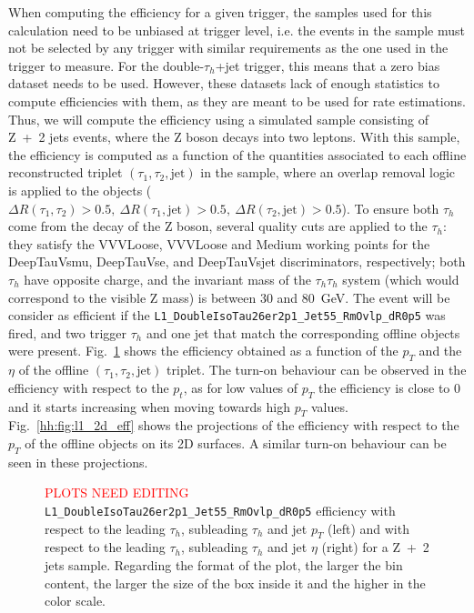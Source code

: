 \documentclass[../main.tex]{subfiles}
\begin{document}
When computing the efficiency for a given trigger, the samples used for this calculation need to be unbiased at trigger level, i.e. the events in the sample must not be selected by any trigger with similar requirements as the one used in the trigger to measure. For the double-$\tau_h$+jet trigger, this means that a zero bias dataset needs to be used. However, these datasets lack of enough statistics to compute efficiencies with them, as they are meant to be used for rate estimations. Thus, we will compute the efficiency using a simulated sample consisting of Z~+~2 jets events, where the Z boson decays into two leptons. With this sample, the efficiency is computed as a function of the quantities associated to each offline reconstructed triplet $(\tau_1, \tau_2, \text{jet})$ in the sample, where an overlap removal logic is applied to the objects ($\Delta R(\tau_1,\tau_2)>0.5,~\Delta R(\tau_1,\text{jet})>0.5,~\Delta R(\tau_2,\text{jet}) > 0.5$). To ensure both $\tau_h$ come from the decay of the Z boson, several quality cuts are applied to the $\tau_h$: they satisfy the VVVLoose, VVVLoose and Medium working points for the DeepTauVsmu, DeepTauVse, and DeepTauVsjet discriminators, respectively; both $\tau_h$ have opposite charge, and the invariant mass of the $\tau_h\tau_h$ system (which would correspond to the visible Z mass) is between 30 and 80~GeV. The event will be consider as efficient if the \texttt{L1\_DoubleIsoTau26er2p1\_Jet55\_RmOvlp\_dR0p5} was fired, and two trigger $\tau_h$ and one jet that match the corresponding offline objects were present. Fig.~\ref{hh:fig:l1_3d_eff} shows the efficiency obtained as a function of the $p_T$ and the $\eta$ of the offline $(\tau_1, \tau_2, \text{jet})$ triplet. The turn-on behaviour can be observed in the efficiency with respect to the $p_t$, as for low values of $p_T$ the efficiency is close to 0 and it starts increasing when moving towards high $p_T$ values. Fig.~\ref{hh:fig:l1_2d_eff} shows the projections of the efficiency with respect to the $p_T$ of the offline objects on its 2D surfaces. A similar turn-on behaviour can be seen in these projections.

\begin{figure}[h!]
\begin{center}
\end{center}
\caption{\textcolor{red}{PLOTS NEED EDITING} \texttt{L1\_DoubleIsoTau26er2p1\_Jet55\_RmOvlp\_dR0p5} efficiency with respect to the leading $\tau_h$, subleading $\tau_h$ and jet $p_T$  (left) and with respect to the leading $\tau_h$, subleading $\tau_h$ and jet $\eta$  (right) for a Z~+~2 jets sample. Regarding the format of the plot, the larger the bin content, the larger the size of the box inside it and the higher in the color scale.}
\label{hh:fig:l1_3d_eff}
\end{figure}
\end{document}
